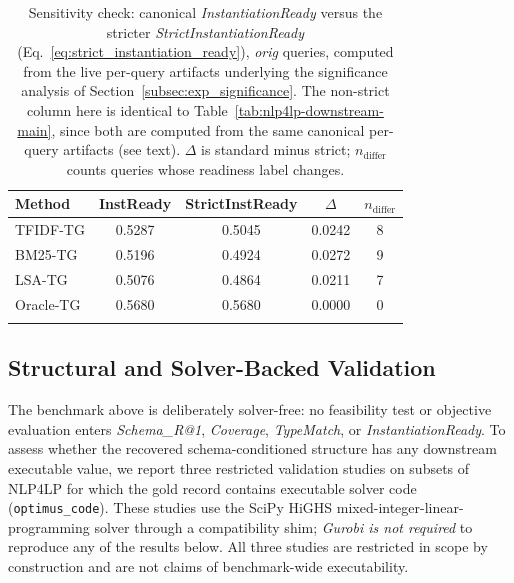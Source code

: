 \documentclass[pdflatex,sn-basic,Numbered]{sn-jnl}
\begin{document}
\begin{table}[t]
\centering
\caption{Sensitivity check: canonical \textit{InstantiationReady} versus the stricter \textit{StrictInstantiationReady} (Eq.~\eqref{eq:strict_instantiation_ready}), \emph{orig} queries, computed from the live per-query artifacts underlying the significance analysis of Section~\ref{subsec:exp_significance}. The non-strict column here is identical to Table~\ref{tab:nlp4lp-downstream-main}, since both are computed from the same canonical per-query artifacts (see text). $\Delta$ is standard minus strict; $n_{\text{differ}}$ counts queries whose readiness label changes.}
\label{tab:strict-instready}
\small
\begin{tabular}{lcccc}
  \toprule
  Method & InstReady & StrictInstReady & $\Delta$ & $n_{\text{differ}}$ \\
  \midrule
  TFIDF-TG  & 0.5287 & 0.5045 & 0.0242 & 8 \\
  BM25-TG   & 0.5196 & 0.4924 & 0.0272 & 9 \\
  LSA-TG    & 0.5076 & 0.4864 & 0.0211 & 7 \\
  Oracle-TG & 0.5680 & 0.5680 & 0.0000 & 0 \\
  \botrule
\end{tabular}
\end{table}

\subsection{Structural and Solver-Backed Validation}
\label{subsec:exp_engineering}

The benchmark above is deliberately solver-free: no feasibility test or objective evaluation enters \textit{Schema\_R@1}, \textit{Coverage}, \textit{TypeMatch}, or \textit{InstantiationReady}. To assess whether the recovered schema-conditioned structure has any downstream executable value, we report three restricted validation studies on subsets of \textsc{NLP4LP} for which the gold record contains executable solver code (\texttt{optimus\_code}). These studies use the SciPy HiGHS mixed-integer-linear-programming solver through a compatibility shim; \emph{Gurobi is not required} to reproduce any of the results below. All three studies are restricted in scope by construction and are not claims of benchmark-wide executability.
\end{document}
